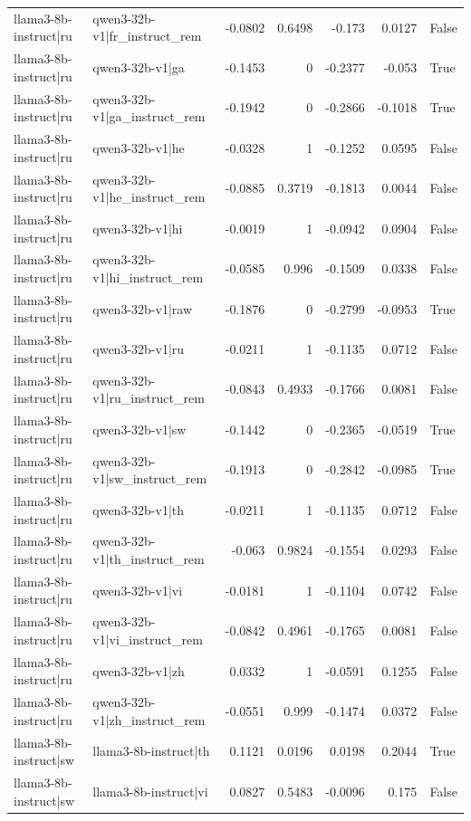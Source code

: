\begin{table}
\begin{tabular}{l l r r r r l}
llama3-8b-instruct|ru & qwen3-32b-v1|fr_instruct_rem & -0.0802 & 0.6498 & -0.173 & 0.0127 & False \\
llama3-8b-instruct|ru & qwen3-32b-v1|ga & -0.1453 & 0 & -0.2377 & -0.053 & True \\
llama3-8b-instruct|ru & qwen3-32b-v1|ga_instruct_rem & -0.1942 & 0 & -0.2866 & -0.1018 & True \\
llama3-8b-instruct|ru & qwen3-32b-v1|he & -0.0328 & 1 & -0.1252 & 0.0595 & False \\
llama3-8b-instruct|ru & qwen3-32b-v1|he_instruct_rem & -0.0885 & 0.3719 & -0.1813 & 0.0044 & False \\
llama3-8b-instruct|ru & qwen3-32b-v1|hi & -0.0019 & 1 & -0.0942 & 0.0904 & False \\
llama3-8b-instruct|ru & qwen3-32b-v1|hi_instruct_rem & -0.0585 & 0.996 & -0.1509 & 0.0338 & False \\
llama3-8b-instruct|ru & qwen3-32b-v1|raw & -0.1876 & 0 & -0.2799 & -0.0953 & True \\
llama3-8b-instruct|ru & qwen3-32b-v1|ru & -0.0211 & 1 & -0.1135 & 0.0712 & False \\
llama3-8b-instruct|ru & qwen3-32b-v1|ru_instruct_rem & -0.0843 & 0.4933 & -0.1766 & 0.0081 & False \\
llama3-8b-instruct|ru & qwen3-32b-v1|sw & -0.1442 & 0 & -0.2365 & -0.0519 & True \\
llama3-8b-instruct|ru & qwen3-32b-v1|sw_instruct_rem & -0.1913 & 0 & -0.2842 & -0.0985 & True \\
llama3-8b-instruct|ru & qwen3-32b-v1|th & -0.0211 & 1 & -0.1135 & 0.0712 & False \\
llama3-8b-instruct|ru & qwen3-32b-v1|th_instruct_rem & -0.063 & 0.9824 & -0.1554 & 0.0293 & False \\
llama3-8b-instruct|ru & qwen3-32b-v1|vi & -0.0181 & 1 & -0.1104 & 0.0742 & False \\
llama3-8b-instruct|ru & qwen3-32b-v1|vi_instruct_rem & -0.0842 & 0.4961 & -0.1765 & 0.0081 & False \\
llama3-8b-instruct|ru & qwen3-32b-v1|zh & 0.0332 & 1 & -0.0591 & 0.1255 & False \\
llama3-8b-instruct|ru & qwen3-32b-v1|zh_instruct_rem & -0.0551 & 0.999 & -0.1474 & 0.0372 & False \\
llama3-8b-instruct|sw & llama3-8b-instruct|th & 0.1121 & 0.0196 & 0.0198 & 0.2044 & True \\
llama3-8b-instruct|sw & llama3-8b-instruct|vi & 0.0827 & 0.5483 & -0.0096 & 0.175 & False \\

\end{tabular}
\end{table}
